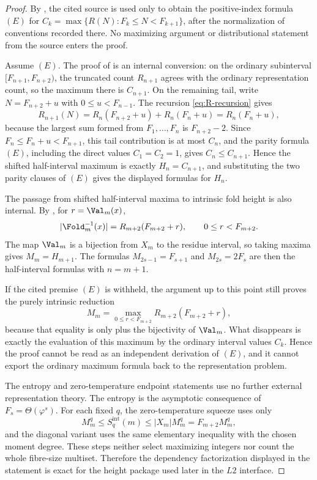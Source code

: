 \begin{proof}
By , the cited source is used
only to obtain the positive-index formula \((E)\) for
\(C_k=\max\{R(N):F_k\le N<F_{k+1}\}\), after the normalization of conventions
recorded there.  No maximizing argument or distributional statement from the
source enters the proof.

Assume \((E)\).  The proof of
 is an internal conversion:
on the ordinary subinterval \([F_{n+1},F_{n+2})\), the truncated count
\(R_{n+1}\) agrees with the ordinary representation count, so the maximum there
is \(C_{n+1}\).  On the remaining tail, write
\(N=F_{n+2}+u\) with \(0\le u<F_{n-1}\).  The recursion \eqref{eq:R-recursion}
gives
\[
  R_{n+1}(N)=R_n(F_{n+2}+u)+R_n(F_n+u)=R_n(F_n+u),
\]
because the largest sum formed from \(F_1,\ldots,F_n\) is \(F_{n+2}-2\).  Since
\(F_n\le F_n+u<F_{n+1}\), this tail contribution is at most \(C_n\), and the
parity formula \((E)\), including the direct values \(C_1=C_2=1\), gives
\(C_n\le C_{n+1}\).  Hence the shifted half-interval maximum is exactly
\(H_n=C_{n+1}\), and substituting the two parity clauses of \((E)\) gives the
displayed formulas for \(H_n\).

The passage from shifted half-interval maxima to intrinsic fold height is also
internal.  By , for
\(r=\Val_m(x)\),
\[
  |\Fold_m^{-1}(x)|=R_{m+2}(F_{m+2}+r),\qquad 0\le r<F_{m+2}.
\]
The map \(\Val_m\) is a bijection from \(X_m\) to the residue interval, so taking
maxima gives \(M_m=H_{m+1}\).  The formulas
\(M_{2s-1}=F_{s+1}\) and \(M_{2s}=2F_s\) are then the half-interval formulas with
\(n=m+1\).

If the cited premise \((E)\) is withheld, the argument up to this point still
proves the purely intrinsic reduction
\[
  M_m=\max_{0\le r<F_{m+2}}R_{m+2}(F_{m+2}+r),
\]
because that equality is only  plus
the bijectivity of \(\Val_m\).  What disappears is exactly the evaluation of this
maximum by the ordinary interval values \(C_k\).  Hence the proof cannot be read
as an independent derivation of \((E)\), and it cannot export the ordinary maximum
formula back to the representation problem.

The entropy and zero-temperature endpoint statements use no further external
representation theory.  The entropy is the asymptotic consequence of
\(F_s=\Theta(\varphi^s)\).  For each fixed \(q\), the zero-temperature squeeze uses
only
\[
  M_m^q\le S_q^{\mathrm{int}}(m)
  \le |X_m|M_m^q=F_{m+2}M_m^q,
\]
and the diagonal variant uses the same elementary inequality with the chosen
moment degree.  These steps neither select maximizing integers nor count the
whole fibre-size multiset.  Therefore the dependency factorization displayed in
the statement is exact for the height package used later in the \(L2\) interface.


\end{proof}
